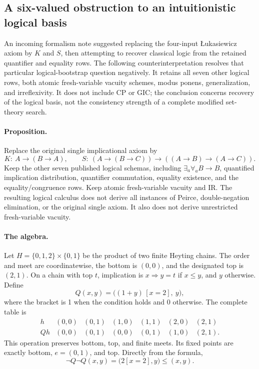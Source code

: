 \subsection{A six-valued obstruction to an intuitionistic logical basis}
\label{sec:ks-obstruction}

An incoming formalism note suggested replacing the four-input
\L ukasiewicz axiom by $K$ and $S$, then attempting to recover classical
logic from the retained quantifier and equality rows.  The following
counterinterpretation resolves that particular logical-bootstrap question
negatively.  It retains all seven other logical rows, both atomic
fresh-variable vacuity schemes, modus ponens, generalization, and
irreflexivity.  It does not include CP or GIC; the conclusion concerns
recovery of the logical basis, not the consistency strength of a complete
modified set-theory search.

\paragraph{Proposition.}
Replace the original single implicational axiom by
\[
 K:\ A\to(B\to A),\qquad
 S:\ (A\to(B\to C))\to((A\to B)\to(A\to C)).
\]
Keep the other seven published logical schemas, including
$\exists_a\forall_a B\to B$, quantified implication distribution,
quantifier commutation, equality existence, and the equality/congruence
rows.  Keep atomic fresh-variable vacuity and IR.
The resulting logical calculus does not derive all instances of Peirce,
double-negation elimination, or the original single axiom.  It also does
not derive unrestricted fresh-variable vacuity.

\paragraph{The algebra.}
Let $H=\{0,1,2\}\times\{0,1\}$ be the product of two finite Heyting
chains.  The order and meet are coordinatewise, the bottom is $(0,0)$,
and the designated top is $(2,1)$.  On a chain with top $t$, implication
is $x\Rightarrow y=t$ if $x\le y$, and $y$ otherwise.  Define
\[
 Q(x,y)=\bigl((1+y)\,[x=2],\ y\bigr),
\]
where the bracket is 1 when the condition holds and 0 otherwise.
The complete table is
\[
\begin{array}{c|rrrrrr}
h&(0,0)&(0,1)&(1,0)&(1,1)&(2,0)&(2,1)\\\hline
Qh&(0,0)&(0,1)&(0,0)&(0,1)&(1,0)&(2,1).
\end{array}
\]
This operation preserves bottom, top, and finite meets.  Its fixed
points are exactly bottom, $e=(0,1)$, and top.  Directly from the formula,
\begin{equation}
 \neg Q\neg Q(x,y)=\bigl(2[x=2],y\bigr)\le(x,y).
 \tag{12}
 \label{eq:ks-rho6}
\end{equation}

